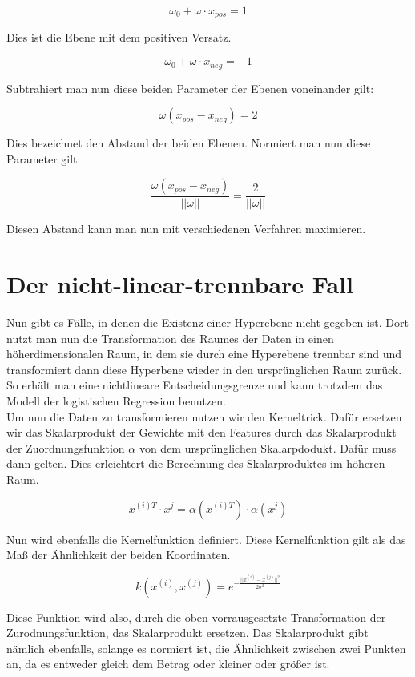 \documentclass[11pt]{article} %
\begin{document}
\begin{equation}
\omega_{0} + \omega \cdot x_{pos} = 1
\end{equation}

Dies ist die Ebene mit dem positiven Versatz.

\begin{equation}
\omega_{0} + \omega \cdot x_{neg} = -1
\end{equation}

Subtrahiert man nun diese beiden Parameter der Ebenen voneinander gilt:

\begin{equation}
 \omega (x_{pos} -  x_{neg}) = 2
\end{equation}

Dies bezeichnet den Abstand der beiden Ebenen. Normiert man nun diese Parameter gilt:

\begin{equation}
\frac{\omega (x_{pos} -  x_{neg}) }{||\omega||} = \frac{2}{||\omega||}
\end{equation}

Diesen Abstand kann man nun mit verschiedenen Verfahren maximieren.

\section{Der nicht-linear-trennbare Fall}
Nun gibt es Fälle, in denen die Existenz einer Hyperebene nicht gegeben ist. Dort nutzt man nun die Transformation des Raumes der Daten
in einen höherdimensionalen Raum, in dem sie durch eine Hyperebene trennbar sind und transformiert dann diese Hyperbene wieder in den
ursprünglichen Raum zurück. So erhält man eine nichtlineare Entscheidungsgrenze und kann trotzdem das Modell der logistischen Regression benutzen. 
\\
Um nun die Daten zu transformieren nutzen wir den Kerneltrick. Dafür ersetzen wir das Skalarprodukt der Gewichte mit den Features durch das Skalarprodukt der Zuordnungsfunktion $\alpha$ von dem ursprünglichen Skalarpdodukt. Dafür muss dann gelten. Dies erleichtert die Berechnung des Skalarproduktes im höheren Raum.

\begin{equation}
x^{(i)T} \cdot x^j = \alpha(x^{(i)T}) \cdot \alpha(x^j)
\end{equation}

Nun wird ebenfalls die Kernelfunktion definiert. Diese Kernelfunktion gilt als das Maß der Ähnlichkeit der beiden Koordinaten.

\begin{equation}
k(x^{(i)}, x^{(j)}) = e^{-\frac{||x^{(i)}- x^{(j)}||^2} {2 \sigma^2}}
\end{equation}

Diese Funktion wird also, durch die oben-vorrausgesetzte Transformation der Zurodnungsfunktion, das Skalarprodukt ersetzen. Das Skalarprodukt gibt nämlich ebenfalls, solange es
normiert ist, die Ähnlichkeit zwischen zwei Punkten an, da es entweder gleich dem Betrag oder kleiner oder größer ist.  
\end{document}
